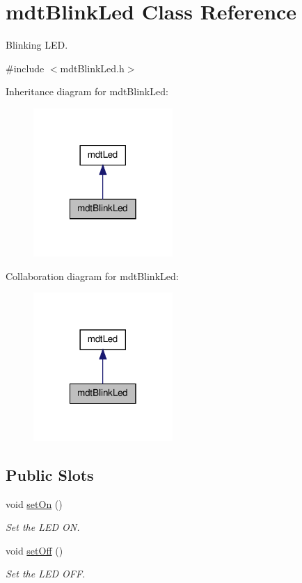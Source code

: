 \hypertarget{classmdt_blink_led}{
\section{mdtBlinkLed Class Reference}
\label{classmdt_blink_led}
}


Blinking LED.  




{\ttfamily \#include $<$mdtBlinkLed.h$>$}



Inheritance diagram for mdtBlinkLed:\nopagebreak
\begin{figure}[H]
\begin{center}
\leavevmode
\includegraphics[width=150pt]{classmdt_blink_led__inherit__graph}
\end{center}
\end{figure}


Collaboration diagram for mdtBlinkLed:\nopagebreak
\begin{figure}[H]
\begin{center}
\leavevmode
\includegraphics[width=150pt]{classmdt_blink_led__coll__graph}
\end{center}
\end{figure}
\subsection*{Public Slots}
\begin{DoxyCompactItemize}
\item 
void \hyperlink{classmdt_blink_led_ae51c54f31a11dbaebe69ab2c0b814d0f}{setOn} ()
\begin{DoxyCompactList}\small\item\em Set the LED ON. \end{DoxyCompactList}\item 
void \hyperlink{classmdt_blink_led_a951465e8a9ae5167e7eb05a7107ab13f}{setOff} ()
\begin{DoxyCompactList}\small\item\em Set the LED OFF. \end{DoxyCompactList}\end{DoxyCompactItemize}

